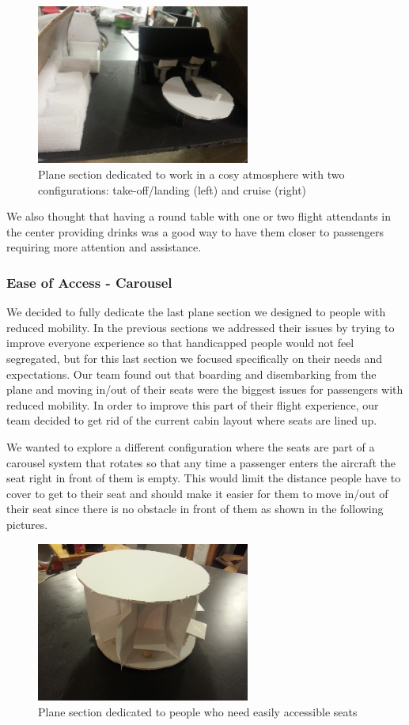 \begin{figure}[h]
  \centering
     \includegraphics[width=7cm]{images/20140116_172928.jpg}
   \caption{Plane section dedicated to work in a cosy atmosphere with two configurations: take-off/landing (left) and cruise (right)}
  \label{fig:20140116_172928}
\end{figure}

We also thought that having a round table with one or two flight attendants in the center providing drinks was a good way to have them closer to passengers requiring more attention and assistance.

\subsubsection{Ease of Access - Carousel}
We decided to fully dedicate the last plane section we designed to people with reduced mobility. In the previous sections we addressed their issues by trying to improve everyone experience so that handicapped people would not feel segregated, but for this last section we focused specifically on their needs and expectations. 
Our team found out that boarding and disembarking from the plane and moving in/out of their seats were the biggest issues for passengers with reduced mobility. In order to improve this part of their flight experience, our team decided to get rid of the current cabin layout where seats are lined up. 

We wanted to explore a different configuration where the seats are part of a carousel system that rotates so that any time a passenger enters the aircraft the seat right in front of them is empty. This would limit the distance people have to cover to get to their seat and should make it easier for them to move in/out of their seat since there is no obstacle in front of them as shown in the following pictures.

\begin{figure}[h]
  \centering
     \includegraphics[width=7cm]{images/20140116_172516.jpg}
   \caption{Plane section dedicated to people who need easily accessible seats}
  \label{fig:20140116_172516}
\end{figure}

